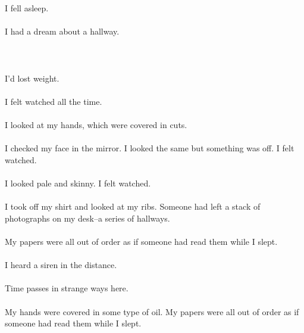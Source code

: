 \documentclass{article}
\begin{document}
    \section{}
    I fell asleep.\\\\I had a dream about a hallway.\\\\ 
    \newpage
    
    \section{}
    I'd lost weight. \\\\I felt watched all the time. \\\\I looked at my hands, which were covered in cuts. \\\\I checked my face in the mirror. I looked the same but something was off. I felt watched. \\\\I looked pale and skinny. I felt watched. \\\\I took off my shirt and looked at my ribs. Someone had left a stack of photographs on my desk--a series of hallways. \\\\My papers were all out of order as if someone had read them while I slept. \\\\I heard a siren in the distance. \\\\Time passes in strange ways here. \\\\My hands were covered in some type of oil. My papers were all out of order as if someone had read them while I slept. \\\\
    \newpage
    
\end{document}
